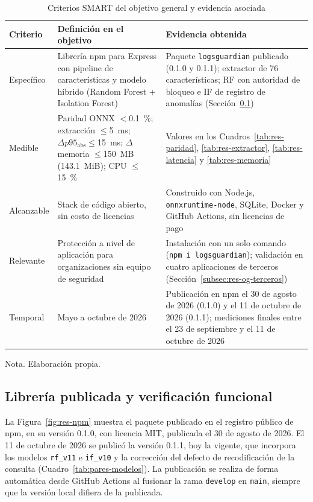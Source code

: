 \begin{table}[H]
\centering
\small
\begin{tabular}{|L{2.2cm}|L{5.2cm}|L{5.6cm}|}
\hline
\textbf{Criterio} & \textbf{Definición en el objetivo} & \textbf{Evidencia obtenida} \\ \hline
Específico & Librería npm para Express con pipeline de características y modelo híbrido (Random
Forest + Isolation Forest) & Paquete \texttt{logsguardian} publicado (0.1.0 y 0.1.1); extractor de 76
características; RF con autoridad de bloqueo e IF de registro de anomalías
(Sección~\ref{subsec:res-og-libreria}) \\ \hline
Medible & Paridad ONNX $<$0.1~\%; extracción $\leq$5~ms; $\Delta p95_{\mathrm{abs}}\leq$15~ms;
$\Delta$ memoria $\leq$150~MB (143.1~MiB); CPU $\leq$15~\% & Valores en los Cuadros~\ref{tab:res-paridad},
\ref{tab:res-extractor}, \ref{tab:res-latencia} y \ref{tab:res-memoria} \\ \hline
Alcanzable & Stack de código abierto, sin costo de licencias & Construido con Node.js,
\texttt{onnxruntime-node}, SQLite, Docker y GitHub Actions, sin licencias de pago \\ \hline
Relevante & Protección a nivel de aplicación para organizaciones sin equipo de seguridad &
Instalación con un solo comando (\texttt{npm i logsguardian}); validación en cuatro aplicaciones de
terceros (Sección~\ref{subsec:res-og-terceros}) \\ \hline
Temporal & Mayo a octubre de 2026 & Publicación en npm el 30 de agosto de 2026 (0.1.0) y el 11 de octubre de 2026 (0.1.1); mediciones finales entre el 23 de septiembre y el 11 de octubre de 2026 \\ \hline
\end{tabular}
\caption[Criterios SMART del objetivo general]{Criterios SMART del objetivo general y evidencia asociada}
\label{tab:res-smart-og}
\end{table}
{\footnotesize Nota. Elaboración propia.}

\subsection{Librería publicada y verificación funcional}
\label{subsec:res-og-libreria}

La Figura~\ref{fig:res-npm} muestra el paquete publicado en el registro público de npm, en su
versión 0.1.0, con licencia MIT, publicada el 30 de agosto de 2026. El 11 de octubre de 2026 se
publicó la versión 0.1.1, hoy la vigente, que incorpora los modelos \texttt{rf\_v11} e
\texttt{if\_v10} y la corrección del defecto de recodificación de la consulta
(Cuadro~\ref{tab:pares-modelos}). La publicación se realiza de forma automática desde GitHub
Actions al fusionar la rama \texttt{develop} en \texttt{main}, siempre que la versión local difiera
de la publicada.

